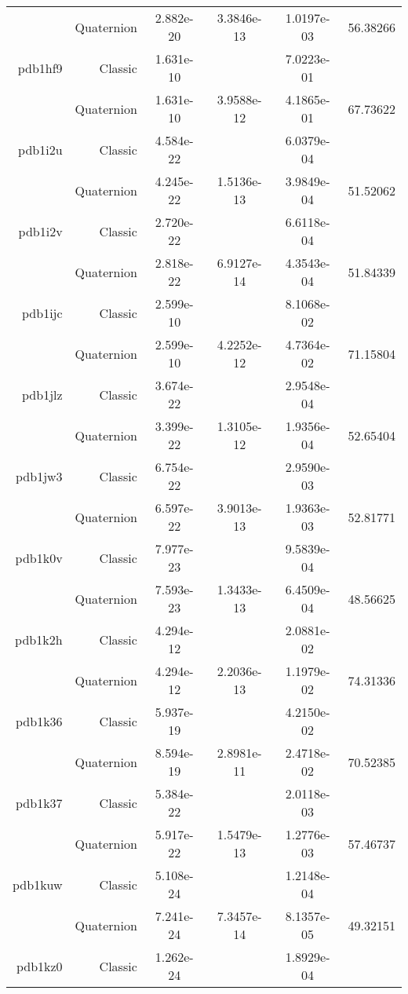 \begin{xltabular}{\textwidth}{r|rS[table-format=1.3e+2]S[table-format=1.4e+2]S[table-format=1.4e+2]S[table-format=-1.5]}
& Quaternion & 2.882e-20 & 3.3846e-13 & 1.0197e-03 & 56.38266\\  \addlinespace
pdb1hf9 & Classic & 1.631e-10 &  & 7.0223e-01 & \\
& Quaternion & 1.631e-10 & 3.9588e-12 & 4.1865e-01 & 67.73622\\  \addlinespace
pdb1i2u & Classic & 4.584e-22 &  & 6.0379e-04 & \\
& Quaternion & 4.245e-22 & 1.5136e-13 & 3.9849e-04 & 51.52062\\  \addlinespace
pdb1i2v & Classic & 2.720e-22 &  & 6.6118e-04 & \\
& Quaternion & 2.818e-22 & 6.9127e-14 & 4.3543e-04 & 51.84339\\  \addlinespace
pdb1ijc & Classic & 2.599e-10 &  & 8.1068e-02 & \\
& Quaternion & 2.599e-10 & 4.2252e-12 & 4.7364e-02 & 71.15804\\  \addlinespace
pdb1jlz & Classic & 3.674e-22 &  & 2.9548e-04 & \\
& Quaternion & 3.399e-22 & 1.3105e-12 & 1.9356e-04 & 52.65404\\  \addlinespace
pdb1jw3 & Classic & 6.754e-22 &  & 2.9590e-03 & \\
& Quaternion & 6.597e-22 & 3.9013e-13 & 1.9363e-03 & 52.81771\\  \addlinespace
pdb1k0v & Classic & 7.977e-23 &  & 9.5839e-04 & \\
& Quaternion & 7.593e-23 & 1.3433e-13 & 6.4509e-04 & 48.56625\\  \addlinespace
pdb1k2h & Classic & 4.294e-12 &  & 2.0881e-02 & \\
& Quaternion & 4.294e-12 & 2.2036e-13 & 1.1979e-02 & 74.31336\\  \addlinespace
pdb1k36 & Classic & 5.937e-19 &  & 4.2150e-02 & \\
& Quaternion & 8.594e-19 & 2.8981e-11 & 2.4718e-02 & 70.52385\\  \addlinespace
pdb1k37 & Classic & 5.384e-22 &  & 2.0118e-03 & \\
& Quaternion & 5.917e-22 & 1.5479e-13 & 1.2776e-03 & 57.46737\\  \addlinespace
pdb1kuw & Classic & 5.108e-24 &  & 1.2148e-04 & \\
& Quaternion & 7.241e-24 & 7.3457e-14 & 8.1357e-05 & 49.32151\\  \addlinespace
pdb1kz0 & Classic & 1.262e-24 &  & 1.8929e-04 & \\

\end{xltabular}
